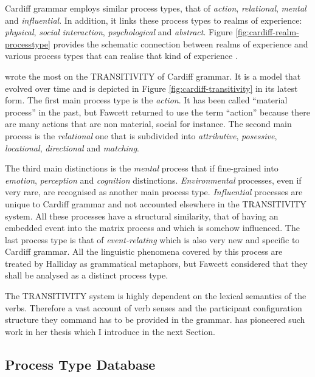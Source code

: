 Cardiff grammar employs similar process types, that of \textit{action}, \textit{relational}, \textit{mental} and \textit{influential}. In addition, it links these process types to realms of experience: \textit{physical}, \textit{social interaction}, \textit{psychological} and \textit{abstract}.
Figure \ref{fig:cardiff-realm-processtype} provides the schematic connection between realms of experience and various process types that can realise that kind of experience \citep[37]{Fawcett2009}. 

\citet{Fawcett1973,Fawcett87-relational,Fawcett96} wrote the most on the TRANSITIVITY of Cardiff grammar. It is a model that evolved over time and is depicted in Figure \ref{fig:cardiff-transitivity} in its latest form. The first main process type is the \textit{action}. It has been called ``material process'' in the past, but Fawcett returned to use the term ``action'' because there are many actions that are non material, social for instance. The second main process is the \textit{relational} one that is subdivided into \textit{attributive}, \textit{posessive}, \textit{locational}, \textit{directional} and \textit{matching}.

The third main distinctions is the \textit{mental} process that if fine-grained into \textit{emotion}, \textit{perception} and \textit{cognition} distinctions. \textit{Environmental} processes, even if very rare, are recognised as another main process type. \textit{Influential} processes are unique to Cardiff grammar and not accounted elsewhere in the TRANSITIVITY system. All these processes have a structural similarity, that of having an embedded event into the matrix process and which is somehow influenced. The last process type is that of \textit{event-relating} which is also very new and specific to Cardiff grammar. All the linguistic phenomena covered by this process are treated by Halliday as grammatical metaphors, but Fawcett considered that they shall be analysed as a distinct process type.

The TRANSITIVITY system is highly dependent on the lexical semantics of the verbs. Therefore a vast account of verb senses and the participant configuration structure they command has to be provided in the grammar. \citet{Neale2002} has pioneered such work in her thesis which I introduce in the next Section. 

\subsection{Process Type Database}
\label{sec:ptdb-description-technical}

